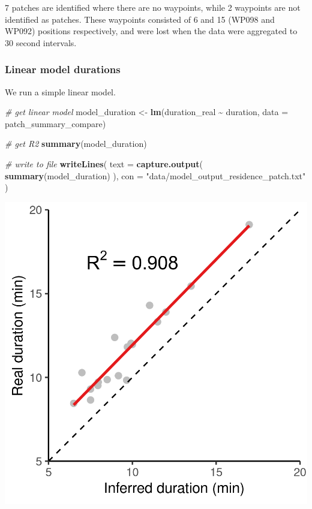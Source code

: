 \documentclass[
]{scrartcl}
\newenvironment{Shaded}{}{}
\newcommand{\CommentTok}[1]{\textcolor[rgb]{0.38,0.63,0.69}{\textit{#1}}}
\newcommand{\DataTypeTok}[1]{\textcolor[rgb]{0.56,0.13,0.00}{#1}}
\newcommand{\KeywordTok}[1]{\textcolor[rgb]{0.00,0.44,0.13}{\textbf{#1}}}
\newcommand{\NormalTok}[1]{#1}
\newcommand{\OperatorTok}[1]{\textcolor[rgb]{0.40,0.40,0.40}{#1}}
\newcommand{\StringTok}[1]{\textcolor[rgb]{0.25,0.44,0.63}{#1}}
\begin{document}
7 patches are identified where there are no waypoints, while 2 waypoints are not identified as patches. These waypoints consisted of 6 and 15 (WP098 and WP092) positions respectively, and were lost when the data were aggregated to 30 second intervals.

\hypertarget{linear-model-durations}{%
\subsubsection{Linear model durations}\label{linear-model-durations}}

We run a simple linear model.

\begin{Shaded}
\begin{Highlighting}[]
\CommentTok{\# get linear model}
\NormalTok{model\_duration <{-}}\StringTok{ }\KeywordTok{lm}\NormalTok{(duration\_real }\OperatorTok{\textasciitilde{}}\StringTok{ }\NormalTok{duration,}
                     \DataTypeTok{data =}\NormalTok{ patch\_summary\_compare)}

\CommentTok{\# get R2}
\KeywordTok{summary}\NormalTok{(model\_duration)}

\CommentTok{\# write to file}
\KeywordTok{writeLines}\NormalTok{(}
  \DataTypeTok{text =} \KeywordTok{capture.output}\NormalTok{(}
    \KeywordTok{summary}\NormalTok{(model\_duration)}
\NormalTok{  ),}
  \DataTypeTok{con =} \StringTok{"data/model\_output\_residence\_patch.txt"}
\NormalTok{)}
\end{Highlighting}
\end{Shaded}

\includegraphics{figures/fig_calib_lm_duration.png}
\end{document}
